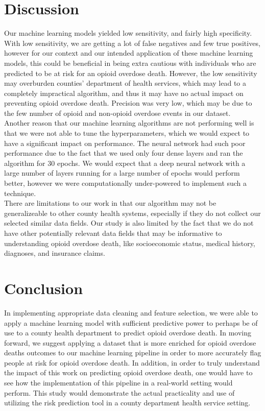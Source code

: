 \documentclass[twoside,10.5pt]{article}
\begin{document}
\section{Discussion}
Our machine learning models yielded low sensitivity, and fairly high specificity. With low sensitivity, we are getting a lot of false negatives and few true positives, however for our context and our intended application of these machine learning models, this could be beneficial in being extra cautious with individuals who are predicted to be at risk for an opioid overdose death. However, the low sensitivity may overburden counties' department of health services, which may lead to a completely impractical algorithm, and thus it may have no actual impact on preventing opioid overdose death. Precision was very low, which may be due to the few number of opioid and non-opioid overdose events in our dataset.\\ 
Another reason that our machine learning algorithms are not performing well is that we were not able to tune the hyperparameters, which we would expect to have a significant impact on performance. The neural network had such poor performance due to the fact that we used only four dense layers and ran the algorithm for 30 epochs. We would expect that a deep neural network with a large number of layers running for a large number of epochs would perform better, however we were computationally under-powered to implement such a technique. \\
There are limitations to our work in that our algorithm may not be generalizeable to other county health systems, especially if they do not collect our selected similar data fields. Our study is also limited by the fact that we do not have other potentially relevant data fields that may be informative to understanding opioid overdose death, like socioeconomic status, medical history, diagnoses, and insurance claims. \\


\section{Conclusion}
In implementing appropriate data cleaning and feature selection, we were able to apply a machine learning model with sufficient predictive power to perhaps be of use to a county health department to predict opioid overdose death. In moving forward, we suggest applying a dataset that is more enriched for opioid overdose deaths outcomes to our machine learning pipeline in order to more accurately flag people at risk for opioid overdose death. In addition, in order to truly understand the impact of this work on predicting opioid overdose death, one would have to see how the implementation of this pipeline in a real-world setting would perform. This study would demonstrate the actual practicality and use of utilizing the risk prediction tool in a county department health service setting.\\
\end{document}
